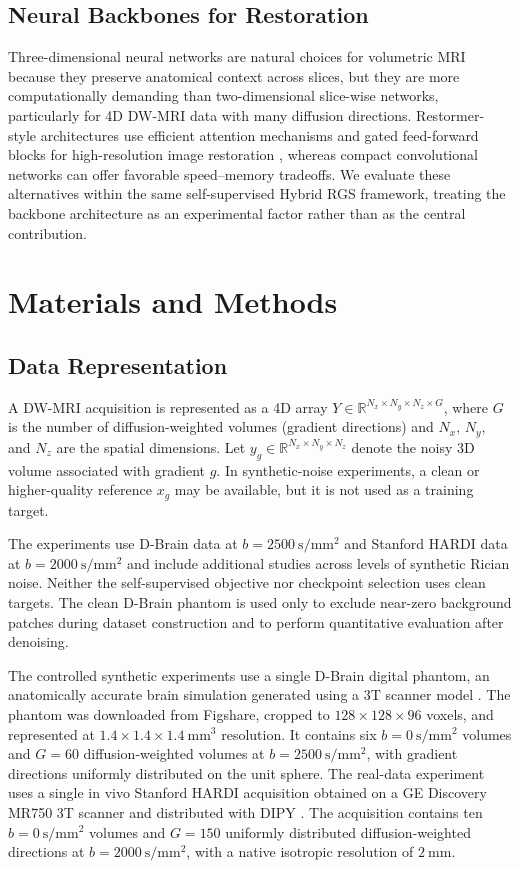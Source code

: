 \documentclass[preprint,12pt]{elsarticle}
\begin{document}
\subsection{Neural Backbones for Restoration}
Three-dimensional neural networks are natural choices for volumetric MRI because they preserve anatomical context across slices, but they are more computationally demanding than two-dimensional slice-wise networks, particularly for 4D DW-MRI data with many diffusion directions. Restormer-style architectures use efficient attention mechanisms and gated feed-forward blocks for high-resolution image restoration \cite{restormer}, whereas compact convolutional networks can offer favorable speed--memory tradeoffs. We evaluate these alternatives within the same self-supervised Hybrid RGS framework, treating the backbone architecture as an experimental factor rather than as the central contribution.

\section{Materials and Methods}
\subsection{Data Representation}
A DW-MRI acquisition is represented as a 4D array $Y \in \mathbb{R}^{N_x \times N_y \times N_z \times G}$, where $G$ is the number of diffusion-weighted volumes (gradient directions) and $N_x$, $N_y$, and $N_z$ are the spatial dimensions. Let $y_g \in \mathbb{R}^{N_x \times N_y \times N_z}$ denote the noisy 3D volume associated with gradient $g$. In synthetic-noise experiments, a clean or higher-quality reference $x_g$ may be available, but it is not used as a training target.

The experiments use D-Brain data at $b=2500~\mathrm{s/mm^2}$ and Stanford HARDI data at $b=2000~\mathrm{s/mm^2}$ and include additional studies across levels of synthetic Rician noise. Neither the self-supervised objective nor checkpoint selection uses clean targets. The clean D-Brain phantom is used only to exclude near-zero background patches during dataset construction and to perform quantitative evaluation after denoising.

The controlled synthetic experiments use a single D-Brain digital phantom, an anatomically accurate brain simulation generated using a 3T scanner model \cite{perrone2016dbrain}. The phantom was downloaded from Figshare, cropped to $128 \times 128 \times 96$ voxels, and represented at $1.4 \times 1.4 \times 1.4~\mathrm{mm^3}$ resolution. It contains six $b=0~\mathrm{s/mm^2}$ volumes and $G=60$ diffusion-weighted volumes at $b=2500~\mathrm{s/mm^2}$, with gradient directions uniformly distributed on the unit sphere. The real-data experiment uses a single in vivo Stanford HARDI acquisition obtained on a GE Discovery MR750 3T scanner and distributed with DIPY \cite{rokem2015accuracy,garyfallidis2014dipy}. The acquisition contains ten $b=0~\mathrm{s/mm^2}$ volumes and $G=150$ uniformly distributed diffusion-weighted directions at $b=2000~\mathrm{s/mm^2}$, with a native isotropic resolution of $2~\mathrm{mm}$.
\end{document}
